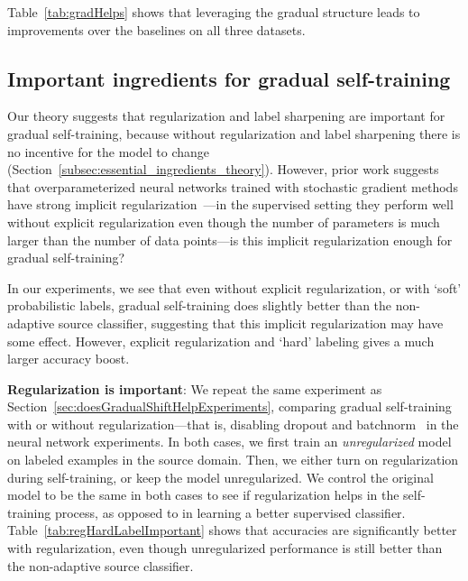 \documentclass[11pt]{article}
\newcommand{\tnote}[1]{}
\newcommand{\ak}[1]{}
\begin{document}
Table~\ref{tab:gradHelps} shows that leveraging the gradual structure leads to improvements over the baselines on all three datasets.


\subsection{Important ingredients for gradual self-training}

Our theory suggests that regularization and label sharpening are important for gradual self-training, because without regularization and label sharpening there is no incentive for the model to change (Section~\ref{subsec:essential_ingredients_theory}).
However, prior work suggests that overparameterized neural networks trained with stochastic gradient methods have strong implicit regularization~\cite{zhang2017understanding, hardt2016train}---in the supervised setting they perform well without explicit regularization even though the number of parameters is much larger than the number of data points---is this implicit regularization enough for gradual self-training?

In our experiments, we see that even without explicit regularization, or with `soft' probabilistic labels, gradual self-training does slightly better than the non-adaptive source classifier, suggesting that this implicit regularization may have some effect.
However, explicit regularization and `hard' labeling gives a much larger accuracy boost.

\textbf{Regularization is important}: We repeat the same experiment as Section~\ref{sec:doesGradualShiftHelpExperiments}, comparing gradual self-training with or without regularization---that is, disabling dropout and batchnorm~\cite{ioffe2015batch} in the neural network experiments.
In both cases, we first train an \emph{unregularized} model on labeled examples in the source domain.
Then, we either turn on regularization during self-training, or keep the model unregularized.
We control the original model to be the same in both cases to see if regularization helps in the self-training process, as opposed to in learning a better supervised classifier.
Table~\ref{tab:regHardLabelImportant} shows that accuracies are significantly better with regularization, even though unregularized performance is still better than the non-adaptive source classifier. \tnote{cite some paper that proposes that batchnorm may have regularization effect? Fixup discuss it a bit but very little, which other paper shows it?} \ak{Cited the original batch norm paper which claims this}
\end{document}
